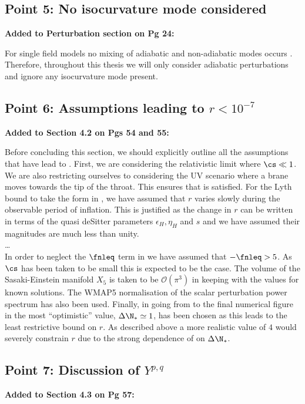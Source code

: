 \subsection{Point 5: No isocurvature mode considered}
\textbf{Added to Perturbation section on Pg 24:}

For single field models no mixing
of adiabatic and non-adiabatic modes occurs \cite{Weinberg200804}. Therefore, throughout this
thesis we will only consider adiabatic perturbations and ignore any isocurvature mode present.

\subsection{Point 6: Assumptions leading to \texorpdfstring{$r<10^{-7}$}{r<10**-7}}
\textbf{Added to Section 4.2 on Pgs 54 and 55:}


Before concluding this section, we should explicitly outline all the assumptions that have lead to
. First, we are considering the relativistic limit where $\cs\ll1$. We are
also restricting ourselves to considering the UV scenario where a brane moves towards the tip of
the throat. This ensures that  is satisfied. For the Lyth bound to take the
form in , we have assumed that $r$ varies slowly during the observable
period of inflation. This is justified as the change in $r$ can be written in terms of the
quasi deSitter parameters $\epsilon_H, \eta_H$ and $s$ and we have assumed their magnitudes are
much less than unity.
\\
\ldots
\\
In order to neglect the $\fnleq$ term in  we have assumed that $-\fnleq>5$. As
$\cs$ has been taken to be small this is expected to be the case. The volume of the Sasaki-Einstein
manifold $X_5$ is taken to be $\mathcal{O}(\pi^3)$ in keeping with the values for known solutions.
The WMAP5 normalisation of the scalar perturbation power spectrum has also been used. Finally, in
going from  to the final numerical figure in  the most
``optimistic'' value, $\Delta \N_*\simeq 1$, has been chosen as this leads to the least
restrictive bound on $r$.  As described above a more realistic value of $4$ would severely
constrain $r$ due to the strong dependence of  on $\Delta\N_*$.

\subsection{Point 7: Discussion of \texorpdfstring{$Y^{p,q}$}{Y**p,q}}
\textbf{Added to Section 4.3 on Pg 57:}

